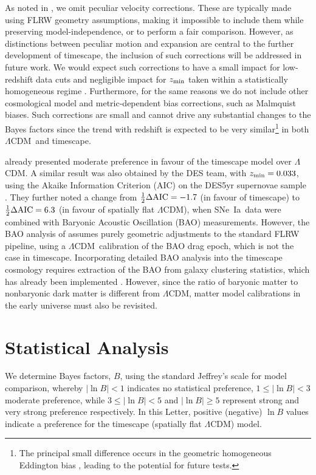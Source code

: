 \documentclass[fleqn,usenatbib,onecolumn,referee]{mnras}
\newcommand{\LA}{\Lambda}
\newcommand{\LCDM}{$\LA$CDM}
\newcommand{\lcdm}{spatially flat $\LA$CDM}
\newcommand{\sne}{SNe~Ia}
\newcommand{\ns}[1]{_{\rm #1}}
\newcommand{\zmin}{z\ns{min}}
\begin{document}
As noted in \citet{Lane_2023}, we omit peculiar velocity corrections. These are typically made using FLRW geometry assumptions, making it impossible to include them while preserving model-independence, or to perform a fair comparison. However, as distinctions between peculiar motion and expansion are central to the further development of timescape, the inclusion of such corrections will be addressed in future work. We would expect such corrections to have a small impact for low-redshift data cuts and negligible impact for $\zmin$ taken within a statistically homogeneous regime \citep{Carr_2022}. Furthermore, for the same reasons we do not include other cosmological model and metric-dependent bias corrections, such as Malmquist biases. Such corrections are small and cannot drive any substantial changes to the Bayes factors since the trend with redshift is expected to be very similar\footnote{The principal small difference occurs in the geometric homogeneous Eddington bias \citep{McKay_thesis_2016}, leading to the potential for future tests.} in both \LCDM\ and timescape.

\citet{Lane_2023} already presented moderate preference in favour of the timescape model over \LCDM. A similar result was also obtained by the DES team, with $\zmin=0.033$, using the Akaike Information Criterion (AIC) on the DES5yr supernovae sample \citep{Camilleri_2024}. They further noted a change from $\frac{1}{2}\Delta {\rm AIC} = -1.7$ (in favour of timescape) to $\frac{1}{2}\Delta {\rm AIC} = 6.3$ (in favour of \lcdm), when \sne \, data were combined with Baryonic Acoustic Oscillation (BAO) measurements. 
However, the BAO analysis of \citet{Camilleri_2024} assumes purely geometric adjustments to the standard FLRW pipeline, using a \LCDM\ calibration of the BAO drag epoch, which is not the case in timescape. Incorporating detailed BAO analysis into the timescape cosmology requires extraction of the BAO from galaxy clustering statistics, which has already been implemented \citep{Heinesen_2019}. However, since the ratio of baryonic matter to nonbaryonic dark matter is different from \LCDM, matter model calibrations in the early universe must also be revisited.

\section{Statistical Analysis}\label{sec:statmethods}

We determine Bayes factors, $B$, using the standard Jeffrey's scale \citep{Kass_1995} for model comparison, whereby $| \ln{B} | < 1$ indicates no statistical preference, $1 \leq | \ln{B} | < 3$ moderate preference, while $3 \leq | \ln{B} | < 5$ and $| \ln{B} | \geq 5$ represent strong and very strong preference respectively. In this Letter, positive (negative) $\ln B$ values indicate a preference for the timescape (\lcdm) model.
\end{document}
